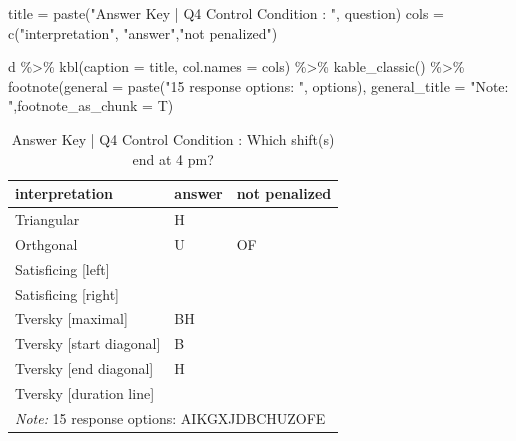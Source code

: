 \documentclass[
  letterpaper,
  DIV=11,
  numbers=noendperiod]{scrreprt}
\newenvironment{Shaded}{\begin{snugshade}}{\end{snugshade}}
\newcommand{\AttributeTok}[1]{\textcolor[rgb]{0.40,0.45,0.13}{#1}}
\newcommand{\FunctionTok}[1]{\textcolor[rgb]{0.28,0.35,0.67}{#1}}
\newcommand{\NormalTok}[1]{\textcolor[rgb]{0.00,0.23,0.31}{#1}}
\newcommand{\OtherTok}[1]{\textcolor[rgb]{0.00,0.23,0.31}{#1}}
\newcommand{\SpecialCharTok}[1]{\textcolor[rgb]{0.37,0.37,0.37}{#1}}
\newcommand{\StringTok}[1]{\textcolor[rgb]{0.13,0.47,0.30}{#1}}
\begin{document}
\begin{Shaded}
\begin{Highlighting}[]
\NormalTok{title }\OtherTok{=} \FunctionTok{paste}\NormalTok{(}\StringTok{"Answer Key | Q4 Control Condition : "}\NormalTok{, question)}
\NormalTok{cols }\OtherTok{=} \FunctionTok{c}\NormalTok{(}\StringTok{"interpretation"}\NormalTok{, }\StringTok{"answer"}\NormalTok{,}\StringTok{"not penalized"}\NormalTok{)}

\NormalTok{d }\SpecialCharTok{\%\textgreater{}\%} \FunctionTok{kbl}\NormalTok{(}\AttributeTok{caption =}\NormalTok{ title, }\AttributeTok{col.names =}\NormalTok{ cols) }\SpecialCharTok{\%\textgreater{}\%} \FunctionTok{kable\_classic}\NormalTok{() }\SpecialCharTok{\%\textgreater{}\%} 
  \FunctionTok{footnote}\NormalTok{(}\AttributeTok{general =} \FunctionTok{paste}\NormalTok{(}\StringTok{"15 response options: "}\NormalTok{, options), }\AttributeTok{general\_title =} \StringTok{"Note: "}\NormalTok{,}\AttributeTok{footnote\_as\_chunk =}\NormalTok{ T) }
\end{Highlighting}
\end{Shaded}

\begin{table}

\caption{Answer Key | Q4 Control Condition :  Which shift(s) end at 4 pm?}
\centering
\begin{tabular}[t]{l|l|l}
\hline
interpretation & answer & not penalized\\
\hline
Triangular & H & \\
\hline
Orthgonal & U & OF\\
\hline
Satisficing [left] &  & \\
\hline
Satisficing [right] &  & \\
\hline
Tversky [maximal] & BH & \\
\hline
Tversky [start diagonal] & B & \\
\hline
Tversky [end diagonal] & H & \\
\hline
Tversky [duration line] &  & \\
\hline
\multicolumn{3}{l}{\rule{0pt}{1em}\textit{Note: } 15 response options:  AIKGXJDBCHUZOFE}\\
\end{tabular}
\end{table}
\end{document}

